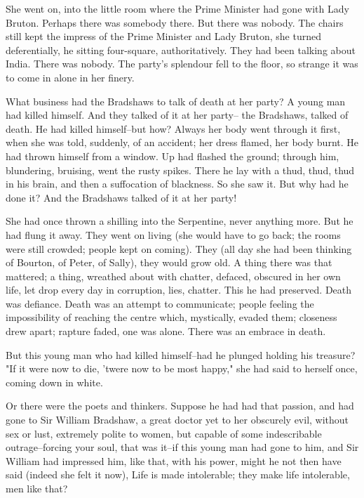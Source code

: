 \documentclass[lang=cn,10pt]{elegantbook}
\begin{document}
She went on, into the little room where the Prime Minister had gone
with Lady Bruton.  Perhaps there was somebody there.  But there was
nobody.  The chairs still kept the impress of the Prime Minister
and Lady Bruton, she turned deferentially, he sitting four-square,
authoritatively.  They had been talking about India.  There was
nobody.  The party's splendour fell to the floor, so strange it was
to come in alone in her finery.

What business had the Bradshaws to talk of death at her party?  A
young man had killed himself.  And they talked of it at her party--
the Bradshaws, talked of death.  He had killed himself--but how?
Always her body went through it first, when she was told, suddenly,
of an accident; her dress flamed, her body burnt.  He had thrown
himself from a window.  Up had flashed the ground; through him,
blundering, bruising, went the rusty spikes.  There he lay with a
thud, thud, thud in his brain, and then a suffocation of blackness.
So she saw it.  But why had he done it?  And the Bradshaws talked
of it at her party!

She had once thrown a shilling into the Serpentine, never anything
more.  But he had flung it away.  They went on living (she would
have to go back; the rooms were still crowded; people kept on
coming).  They (all day she had been thinking of Bourton, of Peter,
of Sally), they would grow old.  A thing there was that mattered; a
thing, wreathed about with chatter, defaced, obscured in her own
life, let drop every day in corruption, lies, chatter.  This he had
preserved.  Death was defiance.  Death was an attempt to
communicate; people feeling the impossibility of reaching the
centre which, mystically, evaded them; closeness drew apart;
rapture faded, one was alone.  There was an embrace in death.

But this young man who had killed himself--had he plunged holding
his treasure?  "If it were now to die, 'twere now to be most
happy," she had said to herself once, coming down in white.

Or there were the poets and thinkers.  Suppose he had had that
passion, and had gone to Sir William Bradshaw, a great doctor yet
to her obscurely evil, without sex or lust, extremely polite to
women, but capable of some indescribable outrage--forcing your
soul, that was it--if this young man had gone to him, and Sir
William had impressed him, like that, with his power, might he not
then have said (indeed she felt it now), Life is made intolerable;
they make life intolerable, men like that?
\end{document}
